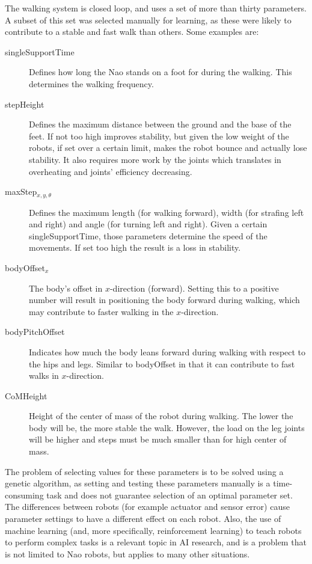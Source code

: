 \documentclass{article}
\begin{document}
The walking system is closed loop, and uses a set of more than thirty parameters. A subset of this set was selected manually for learning, as these were likely to contribute to a stable and fast walk than others.
Some examples are:
\begin{description}
\item[singleSupportTime] Defines how long the Nao stands on a foot for during the walking. This determines the walking frequency.
\item[stepHeight] Defines the maximum distance between the ground and the base of the feet. If not too high improves stability, but given the low weight of the robots, if set over a certain limit, makes the robot bounce and actually lose stability. It also requires more work by the joints which translates in overheating and joints' efficiency decreasing. 
\item[maxStep$_{x,y, \theta }$] Defines the maximum length (for walking forward), width (for strafing left and right) and angle (for turning left and right). Given a certain singleSupportTime, those parameters determine the speed of the movements. If set too high the result is a loss in stability.
\item[bodyOffset$_{x}$] The body's offset in $x$-direction (forward). Setting this to a positive number will result in positioning the body forward during walking, which may contribute to faster walking in the $x$-direction.
\item[bodyPitchOffset] Indicates how much the body leans forward during walking with respect to the hips and legs. Similar to bodyOffset in that it can contribute to fast walks in $x$-direction. 
\item[CoMHeight] Height of the center of mass of the robot during walking. The lower the body will be, the more stable the walk. However, the load on the leg joints will be higher and steps must be much smaller than for high center of mass. 
\end{description}

The problem of selecting values for these parameters is to be solved using a genetic algorithm, as setting and testing these parameters manually is a time-consuming task and does not guarantee selection of an optimal parameter set. The differences between robots (for example actuator and sensor error) cause parameter settings to have a different effect on each robot. Also, the use of machine learning (and, more specifically, reinforcement learning) to teach robots to perform complex tasks is a relevant topic in AI research, and is a problem that is not limited to Nao robots, but applies to many other situations.
\end{document}
